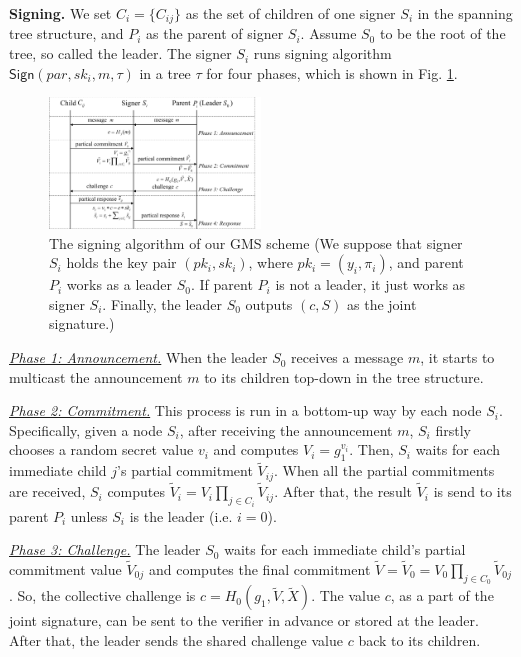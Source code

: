 \documentclass[journal]{IEEEtran}
\begin{document}
\noindent\textbf{Signing.} We set \(C_i=\{C_{ij}\}\) as the set of children of one signer \(S_i\) in the spanning tree structure, and \(P_i\) as the parent of signer \(S_i\). Assume \(S_0\) to be the root of the tree, so called the leader. The signer \(S_i\) runs signing algorithm \(\textsf{Sign}(par,sk_i,m,\tau)\) in a tree \(\tau\) for four phases, which is shown in Fig. \ref{figGMS}.

\begin{figure}
\includegraphics[width=0.5\textwidth]{GMS-eps-converted-to.pdf}
\caption{The signing algorithm of our GMS scheme (We suppose that signer \(S_i\) holds the key pair \((pk_i,sk_i)\), where \(pk_i=(y_i,\pi_i)\), and parent \(P_i\) works as a leader \(S_0\). If parent \(P_i\) is not a leader, it just works as signer \(S_i\). Finally, the leader \(S_0\) outputs \((c,S)\) as the joint signature.)}
\label{figGMS}
\end{figure}

\noindent\emph{\underline{Phase 1: Announcement.}} When the leader \(S_0\) receives a message \(m\), it starts to multicast the announcement \(m\) to its children top-down in the tree structure.

\noindent\emph{\underline{Phase 2: Commitment.}} This process is run in a bottom-up way by each node \(S_i\). Specifically, given a node \(S_i\), after receiving the announcement \(m\), \(S_i\) firstly chooses a random secret value \(v_i\) and computes \(V_i=g_1^{v_i}\). Then, \(S_i\) waits for each immediate child \(j\)'s partial commitment \(\tilde{V}_{ij}\). When all the partial commitments are received, \(S_i\) computes \(\tilde{V}_i=V_i\prod_{j\in C_i} \tilde{V}_{ij}\). After that, the result \(\tilde{V}_i\) is send to its parent \(P_i\) unless \(S_i\) is the leader (i.e. \(i=0\)).

\noindent\emph{\underline{Phase 3: Challenge.}} The leader \(S_0\) waits for each immediate child's partial commitment value \(\tilde{V}_{0j}\) and computes the final commitment \(\tilde{V}=\tilde{V}_0=V_0\prod_{j\in C_0} \tilde{V}_{0j}\). So, the collective challenge is \(c=  H_0(g_1,\tilde{V},\tilde{X})\). The value \(c\), as a part of the joint signature, can be sent to the verifier in advance or stored at the leader. After that, the leader sends the shared challenge value \(c\) back to its children.
\end{document}
